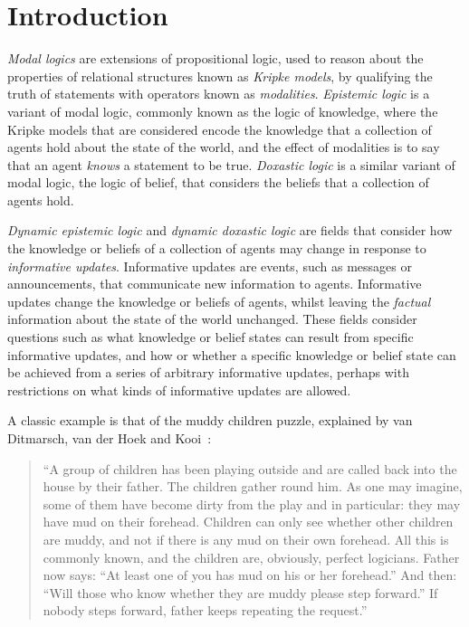 \chapter{Introduction}


{\em Modal logics} are extensions of propositional logic, used to reason about
the properties of relational structures known as {\em Kripke models}, by
qualifying the truth of statements with operators known as {\em modalities}.
{\em Epistemic logic} is a variant of modal logic, commonly known as the logic
of knowledge, where the Kripke models that are considered encode the knowledge
that a collection of agents hold about the state of the world, and the effect of
modalities is to say that an agent {\em knows} a statement to be true. {\em
Doxastic logic} is a similar variant of modal logic, the logic of belief, that
considers the beliefs that a collection of agents hold.

{\em Dynamic epistemic logic} and {\em dynamic doxastic logic} are fields that
consider how the knowledge or beliefs of a collection of agents may change in
response to {\em informative updates}. Informative updates are events, such as
messages or announcements, that communicate new information to agents. 
Informative updates change the knowledge or beliefs of agents, whilst leaving
the {\em factual} information about the state of the world unchanged.  These
fields consider questions such as what knowledge or belief states can result
from specific informative updates, and how or whether a specific knowledge or
belief state can be achieved from a series of arbitrary informative updates,
perhaps with restrictions on what kinds of informative updates are allowed.

A classic example is that of the muddy children puzzle, explained by van
Ditmarsch, van der Hoek and Kooi~\cite{vanditmarsch2007dynamic}:

\begin{quote}
``A group of children has been playing outside and are called back into the house
by their father. The children gather round him. As one may imagine, some of them
have become dirty from the play and in particular: they may have mud on their
forehead. Children can only see whether other children are muddy, and not if
there is any mud on their own forehead. All this is commonly known, and the
children are, obviously, perfect logicians. Father now says: “At least one of
you has mud on his or her forehead.” And then: “Will those who know whether they
are muddy please step forward.” If nobody steps forward, father keeps repeating
the request.''
\end{quote}

